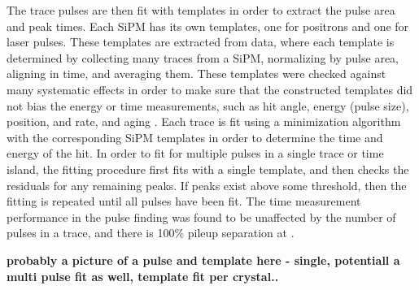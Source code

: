The trace pulses are then fit with templates in order to extract the pulse area and peak times. Each SiPM has its own templates, one for positrons and one for laser pulses. These templates are extracted from data, where each template is determined by collecting many traces from a SiPM, normalizing by pulse area, aligning in time, and averaging them. These templates were checked against many systematic effects in order to make sure that the constructed templates did not bias the energy or time measurements, such as hit angle, energy (pulse size), position, and rate, and aging \cite{Kaspar:2016ofv,AFThesis}. Each trace is fit using a \chisq minimization algorithm with the corresponding SiPM templates in order to determine the time and energy of the hit. In order to fit for multiple pulses in a single trace or time island, the fitting procedure first fits with a single template, and then checks the residuals for any remaining peaks. If peaks exist above some threshold, then the fitting is repeated until all pulses have been fit. The time measurement performance in the pulse finding was found to be unaffected by the number of pulses in a trace, and there is 100\% pileup separation at  \cite{AFThesis}. 


\textbf{probably a picture of a pulse and template here - single, potentiall a multi pulse fit as well, template fit per crystal..}


